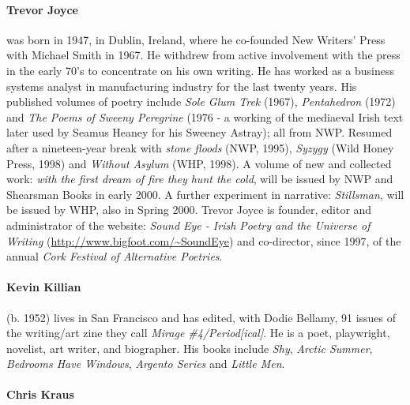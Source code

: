 \documentclass[
]{memoir}
\begin{document}
\hypertarget{trevor-joyce}{%
\paragraph{Trevor Joyce}\label{trevor-joyce}}

was born in 1947, in Dublin, Ireland, where he co-founded New Writers'
Press with Michael Smith in 1967. He withdrew from active involvement
with the press in the early 70's to concentrate on his own writing. He
has worked as a business systems analyst in manufacturing industry for
the last twenty years. His published volumes of poetry include
\emph{Sole Glum Trek} (1967), \emph{Pentahedron} (1972) and \emph{The
Poems of Sweeny Peregrine} (1976 - a working of the mediaeval Irish text
later used by Seamus Heaney for his Sweeney Astray); all from NWP.
Resumed after a nineteen-year break with \emph{stone floods} (NWP,
1995), \emph{Syzygy} (Wild Honey Press, 1998) and \emph{Without Asylum}
(WHP, 1998). A volume of new and collected work: \emph{with the first
dream of fire they hunt the cold}, will be issued by NWP and Shearsman
Books in early 2000. A further experiment in narrative:
\emph{Stillsman}, will be issued by WHP, also in Spring 2000. Trevor
Joyce is founder, editor and administrator of the website: \emph{Sound
Eye - Irish Poetry and the Universe of Writing}
(\href{http://www.bigfoot.com/\%7ESoundE\%20ye}{http://www.bigfoot.com/\textasciitilde{}SoundEye})
and co-director, since 1997, of the annual \emph{Cork Festival of
Alternative Poetries}.

\hypertarget{kevin-killian}{%
\paragraph{Kevin Killian}\label{kevin-killian}}

(b. 1952) lives in San Francisco and has edited, with Dodie Bellamy, 91
issues of the writing/art zine they call \emph{Mirage
\#4/Period{[}ical{]}}. He is a poet, playwright, novelist, art writer,
and biographer. His books include \emph{Shy}, \emph{Arctic Summer},
\emph{Bedrooms Have Windows}, \emph{Argento Series} and \emph{Little
Men}.

\hypertarget{chris-kraus}{%
\paragraph{Chris Kraus}\label{chris-kraus}}
\end{document}
